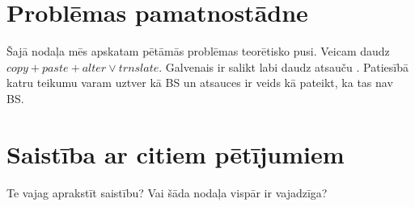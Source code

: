 \section{Problēmas pamatnostādne}
Šajā nodaļa mēs apskatam pētāmās problēmas teorētisko pusi.
Veicam daudz $copy + paste + alter \vee trnslate$.
Galvenais ir salikt labi daudz atsauču \cite{idk}.
Patiesībā katru teikumu varam uztver kā BS un atsauces ir veids kā pateikt, ka tas nav \gls{BS}.

\section{Saistība ar citiem pētījumiem}

Te vajag aprakstīt saistību?
Vai šāda nodaļa vispār ir vajadzīga?